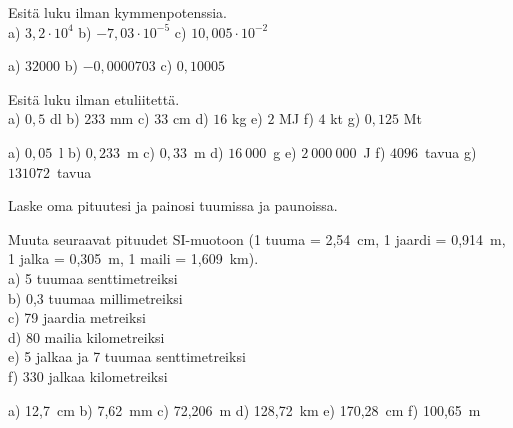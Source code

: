 

\begin{tehtava}
Esitä luku ilman kymmenpotenssia. \\
a) $3,2 \cdot 10^4$ \qquad
b) $-7,03 \cdot 10^{-5}$ \qquad
c) $10,005 \cdot 10^{-2}$ \qquad
\begin{vastaus}
a) $32000$ \qquad
b) $-0,0000703$ \qquad
c) $0,10005$ \qquad
\end{vastaus}
\end{tehtava}


\begin{tehtava}
Esitä luku ilman etuliitettä. \\
a) $0,5$ dl \qquad
b) $233$ mm \qquad
c) $33$ cm \qquad
d) $16$ kg \qquad
e) $2$ MJ \qquad
f) $4$ kt \qquad
g) $0,125$ Mt
\begin{vastaus}
a) $0,05$~l \qquad
b) $0,233$~m \qquad
c) $0,33$~m \qquad
d) $16~000$~g \qquad
e) $2~000~000$~J \qquad
f) $4096$~tavua \qquad
g) $131072$~tavua
\end{vastaus}
\end{tehtava}

\begin{tehtava}
Laske oma pituutesi ja painosi tuumissa ja paunoissa.
\end{tehtava}

\begin{tehtava}
Muuta seuraavat pituudet SI-muotoon (1 tuuma = 2,54~cm, 1 jaardi = 0,914~m, 1 jalka = 0,305~m, 1 maili = 1,609~km). \\
a) 5 tuumaa senttimetreiksi \\
b) 0,3 tuumaa millimetreiksi \\
c) 79 jaardia metreiksi \\
d) 80 mailia kilometreiksi \\
e) 5 jalkaa ja 7 tuumaa senttimetreiksi \\
f) 330 jalkaa kilometreiksi
\begin{vastaus}
a) 12,7~cm \qquad
b) 7,62~mm \qquad
c) 72,206~m \qquad
d) 128,72~km \qquad
e) 170,28~cm \qquad
f) 100,65~m
\end{vastaus}
\end{tehtava}


